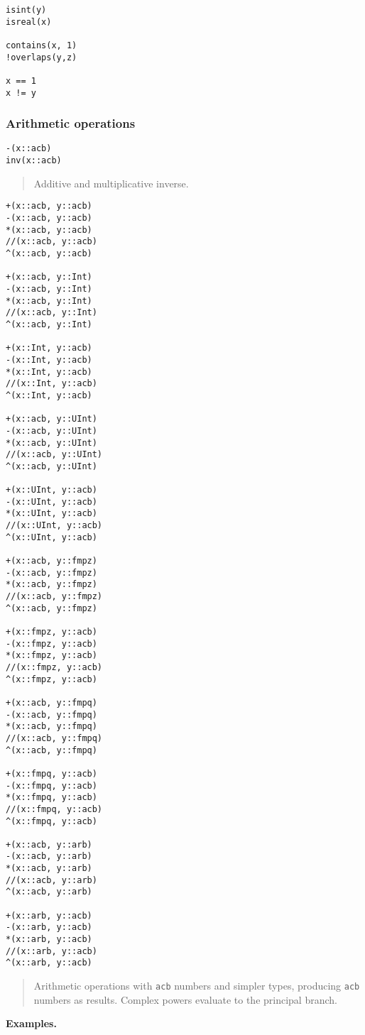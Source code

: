 \documentclass[a4paper,10pt]{article}
\newcommand{\code}{\lstinline}
\newcommand{\desc}[1]{\vspace{-3mm}\begin{quote}#1\end{quote}}
\begin{document}
{{\begin{lstlisting}
isint(y)
isreal(x)

contains(x, 1)
!overlaps(y,z)

x == 1
x != y
\end{lstlisting}

\subsubsection{Arithmetic operations}

\begin{lstlisting}
-(x::acb)
inv(x::acb)
\end{lstlisting}

\desc{Additive and multiplicative inverse.}

\begin{lstlisting}
+(x::acb, y::acb)
-(x::acb, y::acb)
*(x::acb, y::acb)
//(x::acb, y::acb)
^(x::acb, y::acb)

+(x::acb, y::Int)
-(x::acb, y::Int)
*(x::acb, y::Int)
//(x::acb, y::Int)
^(x::acb, y::Int)

+(x::Int, y::acb)
-(x::Int, y::acb)
*(x::Int, y::acb)
//(x::Int, y::acb)
^(x::Int, y::acb)

+(x::acb, y::UInt)
-(x::acb, y::UInt)
*(x::acb, y::UInt)
//(x::acb, y::UInt)
^(x::acb, y::UInt)

+(x::UInt, y::acb)
-(x::UInt, y::acb)
*(x::UInt, y::acb)
//(x::UInt, y::acb)
^(x::UInt, y::acb)

+(x::acb, y::fmpz)
-(x::acb, y::fmpz)
*(x::acb, y::fmpz)
//(x::acb, y::fmpz)
^(x::acb, y::fmpz)

+(x::fmpz, y::acb)
-(x::fmpz, y::acb)
*(x::fmpz, y::acb)
//(x::fmpz, y::acb)
^(x::fmpz, y::acb)

+(x::acb, y::fmpq)
-(x::acb, y::fmpq)
*(x::acb, y::fmpq)
//(x::acb, y::fmpq)
^(x::acb, y::fmpq)

+(x::fmpq, y::acb)
-(x::fmpq, y::acb)
*(x::fmpq, y::acb)
//(x::fmpq, y::acb)
^(x::fmpq, y::acb)

+(x::acb, y::arb)
-(x::acb, y::arb)
*(x::acb, y::arb)
//(x::acb, y::arb)
^(x::acb, y::arb)

+(x::arb, y::acb)
-(x::arb, y::acb)
*(x::arb, y::acb)
//(x::arb, y::acb)
^(x::arb, y::acb)
\end{lstlisting}

\desc{Arithmetic operations with \code{acb} numbers and simpler types,
producing \code{acb} numbers as results. Complex powers
evaluate to the principal branch.}

\textbf{Examples.}

}}
\end{document}
